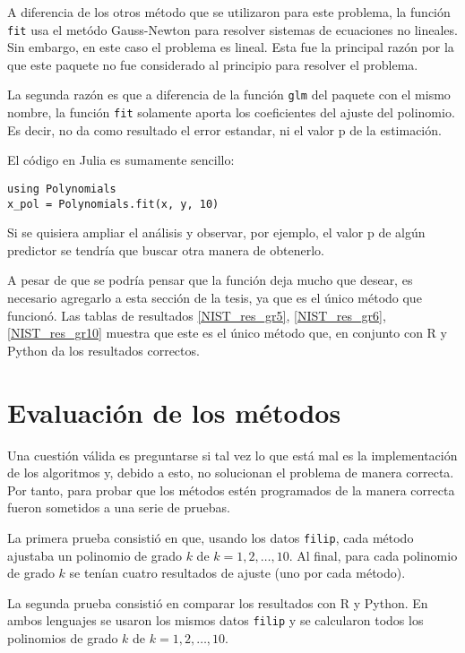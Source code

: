 A diferencia de los otros método que se utilizaron para este problema, la función \texttt{fit} usa el metódo Gauss-Newton para resolver sistemas de ecuaciones no lineales. Sin embargo, en este caso el problema es lineal. Esta fue la principal razón por la que este paquete no fue considerado al principio para resolver el problema. 


La segunda razón es que a diferencia de la función \texttt{glm} del paquete con el mismo nombre, la función \texttt{fit} solamente aporta los coeficientes del ajuste del polinomio. Es decir, no da como resultado el error estandar, ni el valor p de la estimación.

El código en Julia es sumamente sencillo:

\begin{verbatim}
using Polynomials 
x_pol = Polynomials.fit(x, y, 10)
\end{verbatim}

Si se quisiera ampliar el análisis y observar, por ejemplo, el valor p de algún predictor se tendría que buscar otra manera de obtenerlo. 

A pesar de que se podría pensar que la función deja mucho que desear, es necesario agregarlo a esta sección de la tesis, ya que es el único método que funcionó. Las tablas de resultados \ref{NIST_res_gr5}, \ref{NIST_res_gr6}, \ref{NIST_res_gr10} muestra que este es el único método que, en conjunto con \textsf{R} y \textsf{Python} da los resultados correctos. 


\section{Evaluación de los métodos} \label{sec_evalMetodos}
Una cuestión válida es preguntarse si tal vez lo que está mal es la implementación de los algoritmos y, debido a esto, no solucionan el problema de manera correcta. Por tanto, para probar que los métodos estén programados de la manera correcta fueron sometidos a una serie de pruebas.

La primera prueba consistió en que, usando los datos \texttt{filip}, cada método ajustaba un polinomio de grado $k$ de $k = 1, 2, \dots, 10$. Al final, para cada polinomio de grado $k$ se tenían cuatro resultados de ajuste (uno por cada método). 

La segunda prueba consistió en comparar los resultados con \textsf{R} y \textsf{Python}. En ambos lenguajes se usaron los mismos datos \texttt{filip} y se calcularon todos los polinomios  de grado $k$ de $k = 1, 2, \dots, 10$.

